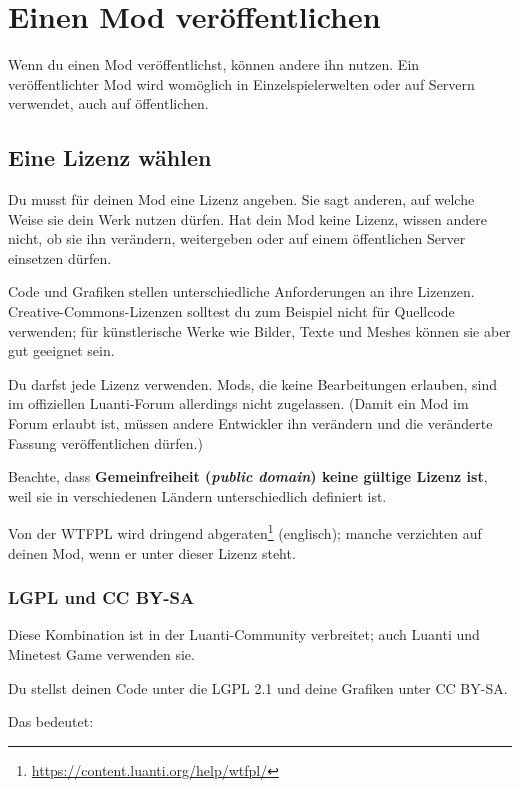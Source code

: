 \chapter{Einen Mod veröffentlichen}
\label{ch:quality/releasing}

Wenn du einen Mod veröffentlichst, können andere ihn nutzen. Ein
veröffentlichter Mod wird womöglich in Einzelspielerwelten oder auf
Servern verwendet, auch auf öffentlichen.

\section{Eine Lizenz wählen}\label{eine-lizenz-wuxe4hlen}

Du musst für deinen Mod eine Lizenz angeben. Sie
sagt anderen, auf welche Weise sie dein Werk nutzen dürfen. Hat dein Mod
keine Lizenz, wissen andere nicht, ob sie ihn verändern, weitergeben
oder auf einem öffentlichen Server einsetzen dürfen.

Code und Grafiken stellen unterschiedliche Anforderungen an ihre
Lizenzen. Creative-Commons-Lizenzen solltest du zum Beispiel nicht für
Quellcode verwenden; für künstlerische Werke wie Bilder, Texte und
Meshes können sie aber gut geeignet sein.

Du darfst jede Lizenz verwenden. Mods, die keine Bearbeitungen erlauben,
sind im offiziellen Luanti-Forum allerdings nicht zugelassen. (Damit ein
Mod im Forum erlaubt ist, müssen andere Entwickler ihn verändern und die
veränderte Fassung veröffentlichen dürfen.)

Beachte, dass \textbf{Gemeinfreiheit (\emph{public domain}) keine
gültige Lizenz ist}, weil sie in verschiedenen Ländern unterschiedlich
definiert ist.

Von der WTFPL wird dringend abgeraten\footnote{\url{https://content.luanti.org/help/wtfpl/}}
(englisch); manche verzichten auf deinen Mod, wenn er unter dieser
Lizenz steht.

\subsection{LGPL und CC BY-SA}\label{lgpl-und-cc-by-sa}

Diese Kombination ist in der Luanti-Community verbreitet; auch Luanti
und Minetest Game verwenden sie.

Du stellst deinen Code unter die LGPL 2.1 und deine Grafiken unter CC
BY-SA.

Das bedeutet:

